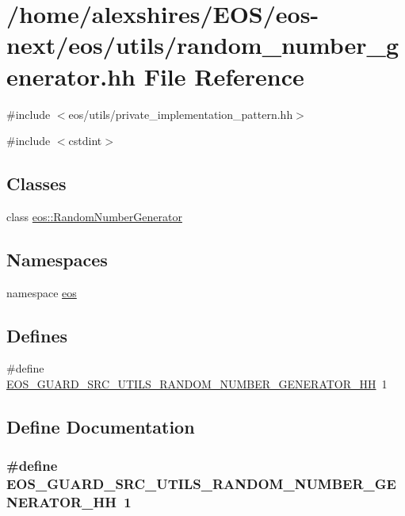 \hypertarget{random__number__generator_8hh}{
\section{/home/alexshires/EOS/eos-\/next/eos/utils/random\_\-number\_\-generator.hh File Reference}
\label{random__number__generator_8hh}
}
{\ttfamily \#include $<$eos/utils/private\_\-implementation\_\-pattern.hh$>$}\par
{\ttfamily \#include $<$cstdint$>$}\par
\subsection*{Classes}
\begin{DoxyCompactItemize}
\item 
class \hyperlink{classeos_1_1RandomNumberGenerator}{eos::RandomNumberGenerator}
\end{DoxyCompactItemize}
\subsection*{Namespaces}
\begin{DoxyCompactItemize}
\item 
namespace \hyperlink{namespaceeos}{eos}
\end{DoxyCompactItemize}
\subsection*{Defines}
\begin{DoxyCompactItemize}
\item 
\#define \hyperlink{random__number__generator_8hh_a191c5ad3acb1207ac8224f9d80ca1868}{EOS\_\-GUARD\_\-SRC\_\-UTILS\_\-RANDOM\_\-NUMBER\_\-GENERATOR\_\-HH}~1
\end{DoxyCompactItemize}


\subsection{Define Documentation}
\hypertarget{random__number__generator_8hh_a191c5ad3acb1207ac8224f9d80ca1868}{
\subsubsection[{EOS\_\-GUARD\_\-SRC\_\-UTILS\_\-RANDOM\_\-NUMBER\_\-GENERATOR\_\-HH}]{\setlength{\rightskip}{0pt plus 5cm}\#define EOS\_\-GUARD\_\-SRC\_\-UTILS\_\-RANDOM\_\-NUMBER\_\-GENERATOR\_\-HH~1}}
\label{random__number__generator_8hh_a191c5ad3acb1207ac8224f9d80ca1868}
